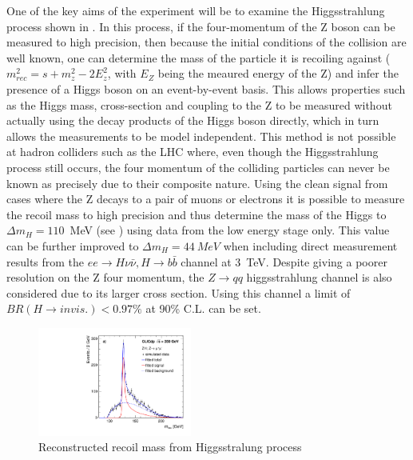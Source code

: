 One of the key aims of the experiment will be to examine the Higgsstrahlung process shown in . In this process, if the four-momentum of the Z boson can be measured to high precision, then because the initial conditions of the collision are well known, one can determine the mass of the particle it is recoiling against ($m_{rec}^{2} = s + m_{z}^{2} - 2E_{z}^{2}$, with $E_Z$ being the meaured energy of the Z) and infer the presence of a Higgs boson on an event-by-event basis. This allows properties such as the Higgs mass, cross-section and coupling to the Z to be measured without actually using the decay products of the Higgs boson directly, which in turn allows the measurements to be model independent. This method is not possible at hadron colliders such as the LHC where, even though the Higgsstrahlung process still occurs, the four momentum of the colliding particles can never be known as precisely due to their composite nature. Using the clean signal from cases where the Z decays to a pair of muons or electrons it is possible to measure the recoil mass to high precision and thus determine the mass of the Higgs to $\Delta m_{H} = 110$~MeV (see ) using data from the low energy stage only. This value can be further improved to $\Delta m_{H} = 44~MeV$ when including direct measurement results from the $ee\rightarrow H\nu\bar{\nu}, H\rightarrow b\bar{b}$ channel at 3~TeV. Despite giving a poorer resolution on the Z four momentum, the $Z\rightarrow qq$ higgsstrahlung channel is also considered due to its larger cross section. Using this channel a limit of $BR(H\rightarrow invis.) <0.97\%$ at 90\% C.L. can be set. 

\begin{figure}
  \centering
  \includegraphics[width=0.45\textwidth,keepaspectratio]{Theory/fig/350GeV_Recoil_mumuX_MrecoilFit.pdf}
  \caption[Reconstructed recoil mass from Higgsstralung process]{Reconstructed recoil mass from Higgsstralung process \cite{Abramowicz:2016zbo}}
  \label{fig:higgsmass}
\end{figure}


